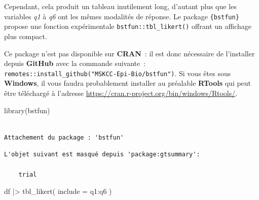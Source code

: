 \documentclass[
  letterpaper,
  DIV=11,
  numbers=noendperiod,
  oneside]{scrreprt}
\newenvironment{Shaded}{\begin{snugshade}}{\end{snugshade}}
\newcommand{\AttributeTok}[1]{\textcolor[rgb]{0.40,0.45,0.13}{#1}}
\newcommand{\FunctionTok}[1]{\textcolor[rgb]{0.28,0.35,0.67}{#1}}
\newcommand{\NormalTok}[1]{\textcolor[rgb]{0.00,0.23,0.31}{#1}}
\newcommand{\SpecialCharTok}[1]{\textcolor[rgb]{0.37,0.37,0.37}{#1}}
\begin{document}
Cependant, cela produit un tableau inutilement long, d'autant plus que
les variables \emph{q1} à \emph{q6} ont les mêmes modalités de réponse.
Le package \texttt{\{bstfun\}} propose une fonction expérimentale
\texttt{bstfun::tbl\_likert()} offrant un affichage plus compact.

\begin{tcolorbox}[enhanced jigsaw, colbacktitle=quarto-callout-important-color!10!white, opacityback=0, toprule=.15mm, colback=white, coltitle=black, bottomtitle=1mm, toptitle=1mm, titlerule=0mm, rightrule=.15mm, title=\textcolor{quarto-callout-important-color}{\faExclamation}\hspace{0.5em}{Important}, breakable, bottomrule=.15mm, opacitybacktitle=0.6, arc=.35mm, left=2mm, leftrule=.75mm, colframe=quarto-callout-important-color-frame]

Ce package n'est pas disponible sur \textbf{CRAN}~: il est donc
nécessaire de l'installer depuis \textbf{GitHub} avec la commande
suivante~: \texttt{remotes::install\_github("MSKCC-Epi-Bio/bstfun")}. Si
vous êtes sous \textbf{Windows}, il vous faudra probablement installer
au préalable \textbf{RTools} qui peut être téléchargé à l'adresse
\url{https://cran.r-project.org/bin/windows/Rtools/}.

\end{tcolorbox}

\begin{Shaded}
\begin{Highlighting}[]
\FunctionTok{library}\NormalTok{(bstfun)}
\end{Highlighting}
\end{Shaded}

\begin{verbatim}

Attachement du package : 'bstfun'
\end{verbatim}

\begin{verbatim}
L'objet suivant est masqué depuis 'package:gtsummary':

    trial
\end{verbatim}

\begin{Shaded}
\begin{Highlighting}[]
\NormalTok{df }\SpecialCharTok{|\textgreater{}} 
  \FunctionTok{tbl\_likert}\NormalTok{(}
    \AttributeTok{include =}\NormalTok{ q1}\SpecialCharTok{:}\NormalTok{q6}
\NormalTok{  )}
\end{Highlighting}
\end{Shaded}
\end{document}

